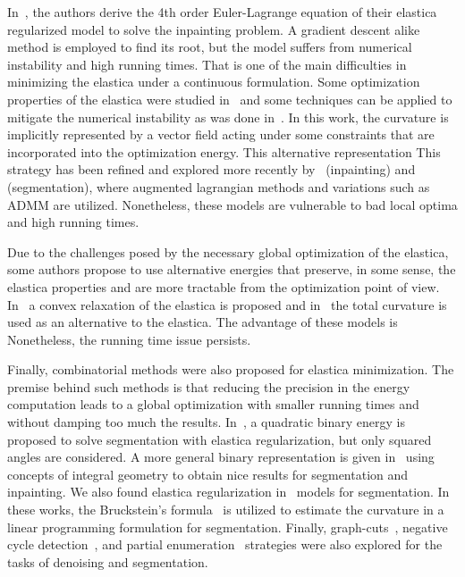 \documentclass[review]{siamart220329}
\begin{document}
In~\cite{chan02elasticainpainting}, the authors derive the 4th order
Euler-Lagrange equation of their elastica regularized model to solve
the inpainting problem. A gradient descent alike method is employed to
find its root, but the model suffers from numerical instability and
high running times. That is one of the main difficulties in minimizing
the elastica under a continuous formulation. Some optimization
properties of the elastica were studied in~\cite{ambrosio2003direct}
and some techniques can be applied to mitigate the numerical
instability as was done in~\cite{ballester01filljoint}. In this work,
the curvature is implicitly represented by a vector field acting under
some constraints that are incorporated into the optimization
energy. This alternative representation  This strategy has been refined
and explored more recently by~\cite{tai11elastica} (inpainting)
and~\cite{zhu2013image,duan2014two} (segmentation), where augmented
lagrangian methods and variations such as ADMM are
utilized. Nonetheless, these models are vulnerable to bad local optima
and  high running times.


Due to the challenges posed by the necessary global optimization of
the elastica, some authors propose to use alternative energies that
preserve, in some sense, the elastica properties and are more
tractable from the optimization point of
view. In~\cite{bredies15convex} a convex relaxation of the elastica is
proposed and in~\cite{goldluecke11totalcurvature,zhong2020minimizing}
the total curvature is used as an alternative to the elastica. The
advantage of these models is  Nonetheless, the running time
issue persists.


Finally, combinatorial methods were also proposed for elastica minimization. The
premise behind such methods is that reducing the precision in the energy
computation leads to a global optimization with smaller running times and
without damping too much the results. In~\cite{zehiry10fast}, a quadratic binary
energy is proposed to solve segmentation with elastica regularization, but only 
squared angles are considered. A more general binary representation is given 
in~\cite{nieuwenhuis14efficient} using concepts of integral geometry to obtain
nice results for segmentation and inpainting. We also found elastica 
regularization in~\cite{schoenemann09linear,strandmark11globalframework} models 
for segmentation. In these works, the Bruckstein's 
formula~\cite{bruckstein01convergence} is utilized to estimate the curvature 
in a linear programming formulation for segmentation. Finally, 
graph-cuts~\cite{bae2010graph}, negative cycle 
detection~\cite{schoenemann2011elastic}, and partial 
enumeration~\cite{olsson2013partial,antunes20} strategies were also explored 
for the tasks of denoising and segmentation.
\end{document}
